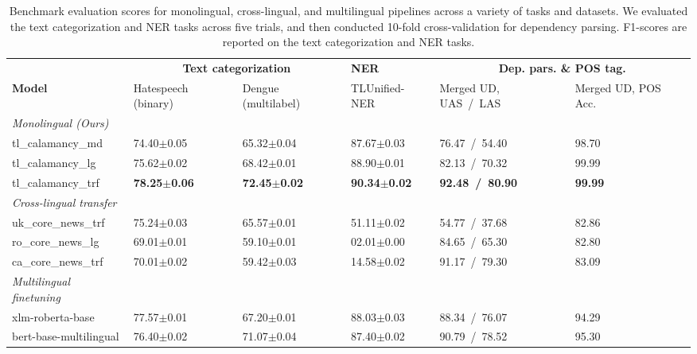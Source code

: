 \documentclass[../report.tex]{subfiles}
\begin{document}
\begin{table*}[t]
\begin{tabular}{@{}p{4cm}p{2cm}p{2cm}p{2cm}p{2cm}p{2cm}@{}}
\toprule
                           & \multicolumn{2}{c}{\textbf{Text categorization}} & \textbf{NER} & \multicolumn{2}{c}{\textbf{Dep. pars. \& POS tag.}}                         \\ 
\textbf{Model}             & Hatespeech (binary) & Dengue (multilabel) & TLUnified-NER & Merged UD, UAS~/~LAS & Merged UD, POS Acc. \\ \midrule 
\textit{Monolingual (Ours)}              \\
tl\_calamancy\_md          & 74.40$\pm$0.05 & 65.32$\pm$0.04 & 87.67$\pm$0.03 & 76.47~/~54.40 & 98.70\\
tl\_calamancy\_lg          & 75.62$\pm$0.02 & 68.42$\pm$0.01 & 88.90$\pm$0.01 & 82.13~/~70.32 & 99.99\\
tl\_calamancy\_trf         & \textbf{78.25$\pm$0.06} & \textbf{72.45$\pm$0.02} & \textbf{90.34$\pm$0.02} & \textbf{92.48~/~80.90} & \textbf{99.99} \\ \midrule
\textit{Cross-lingual transfer} \\
uk\_core\_news\_trf        & 75.24$\pm$0.03 & 65.57$\pm$0.01 & 51.11$\pm$0.02 & 54.77~/~37.68 & 82.86 \\
ro\_core\_news\_lg         & 69.01$\pm$0.01 & 59.10$\pm$0.01 & 02.01$\pm$0.00 & 84.65~/~65.30 & 82.80 \\
ca\_core\_news\_trf        & 70.01$\pm$0.02 & 59.42$\pm$0.03 & 14.58$\pm$0.02 & 91.17~/~79.30 & 83.09 \\ \midrule
\textit{Multilingual finetuning} \\
xlm-roberta-base          & 77.57$\pm$0.01 & 67.20$\pm$0.01 & 88.03$\pm$0.03 & 88.34~/~76.07 & 94.29 \\
bert-base-multilingual    & 76.40$\pm$0.02 & 71.07$\pm$0.04 & 87.40$\pm$0.02 & 90.79~/~78.52 & 95.30 \\
\bottomrule
\end{tabular}
\caption{
    Benchmark evaluation scores for monolingual, cross-lingual, and multilingual pipelines across a variety of tasks and datasets.
    We evaluated the text categorization and NER tasks across five trials, and then conducted 10-fold cross-validation for dependency parsing.
    F1-scores are reported on the text categorization and NER tasks.
}
\label{table:results}
\end{table*}
\end{document}

